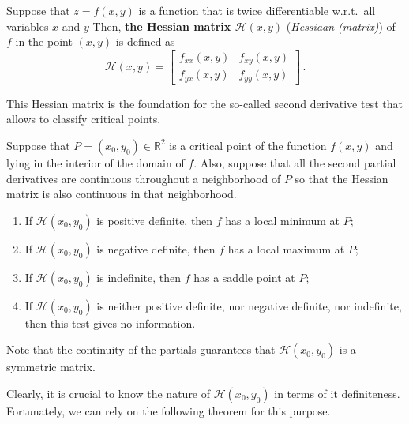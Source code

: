 \begin{definition}
\label{HM}
Suppose that $z=f(x,y)$ is a function that is twice differentiable w.r.t.\ all variables $x$ and $y$ Then, \textbf{the Hessian matrix $\mathscr{H}(x,y)$} (\textit{Hessiaan (matrix)}) of $f$ in the point $(x,y)$ is defined as
$$ \mathscr{H}(x,y) =
\begin{bmatrix}  f_{xx}(x,y) & f_{xy}(x,y) \\  f_{yx}(x,y) &   f_{yy}(x,y) \end{bmatrix} \,. $$
\end{definition} 

This Hessian matrix is the foundation for the so-called second derivative test that allows to classify critical points.

\begin{theorem}
\label{SDT}
Suppose that $P=(x_0,y_0) \in \mathbb{R}^2$ is a critical point of the function $f(x,y)$ and lying in the interior of the domain of $f$. Also, suppose that all  the second partial derivatives are continuous throughout a neighborhood of $P$ so that the Hessian matrix is also continuous in that neighborhood.
\begin{enumerate}
\item If $\mathscr{H}(x_0,y_0)$ is positive definite, then $f$ has a local minimum at $P$;
\item If $\mathscr{H}(x_0,y_0)$ is negative definite, then $f$ has a local maximum  at $P$;
\item If $\mathscr{H}(x_0,y_0)$ is indefinite, then $f$ has a saddle point at $P$;
\item If $\mathscr{H}(x_0,y_0)$ is neither positive definite, nor negative definite, nor indefinite, then this test gives no information. 
\end{enumerate}
\end{theorem}
 Note that the continuity of the partials guarantees that $\mathscr{H}(x_0,y_0)$ is a symmetric matrix. 
 
 Clearly, it is crucial to know the nature of $\mathscr{H}(x_0,y_0)$ in terms of it definiteness. Fortunately, we can rely on the following theorem for this purpose. 
 
